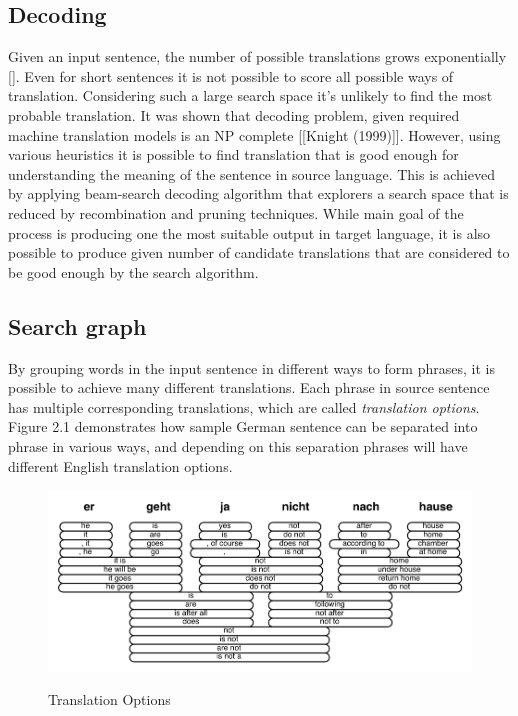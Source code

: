 \subsection{Decoding}

Given an input sentence, the number of possible translations grows exponentially [\cite{Koehn2009a}]. Even for short sentences it is not possible to score all possible ways of translation. Considering such a large search space it's unlikely to find the most probable translation. It was shown that decoding problem, given required machine translation models is an NP complete [[Knight (1999)]]. However, using various heuristics it is possible to find translation that is good enough for understanding the meaning of the sentence in source language. This is achieved by applying beam-search decoding algorithm that explorers a search space that is reduced by recombination and pruning techniques. While main goal of the process is producing one the most suitable output in target language, it is also possible to produce given number of candidate translations that are considered to be good enough by the search algorithm.

\subsection{Search graph}

By grouping words in the input sentence in different ways to form phrases, it is possible to achieve many different translations. Each phrase in source sentence has multiple corresponding translations, which are called \textit{translation options}. Figure 2.1 demonstrates how sample German sentence can be separated into phrase in various ways, and depending on this separation phrases will have different English translation options. 

\begin{figure}
 \centering 
 \includegraphics{g/translation-options.pdf}
 \caption{Translation Options}
 \caption*{\textit{\cite{Koehn2009a}}}
\end{figure}

